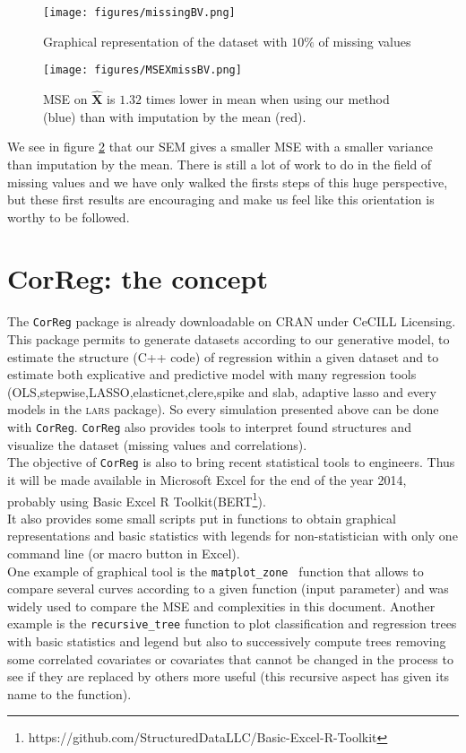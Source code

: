 \documentclass[12pt,a4paper]{report}
\begin{document}
	\begin{figure}[h!]
		\centering
		\texttt{[image: figures/missingBV.png]} 
		\caption{Graphical representation of the dataset with $10\%$ of missing values}\label{missingBV}
	\end{figure}
	\begin{figure}[h!]
		\centering
		\texttt{[image: figures/MSEXmissBV.png]} 
		\caption{MSE on $\hat{\boldsymbol{X}}$ is $1.32$ times lower in mean when using our method (blue) than with imputation by the mean (red).}\label{MSEXmissBV}
	\end{figure}
	We see in figure \ref{MSEXmissBV} that our SEM gives a smaller MSE with a smaller variance than imputation by the mean. There is still a lot of work to do in the field of missing values and we have only walked the firsts steps of this huge perspective, but these first results are encouraging and make us feel like this orientation is worthy to be followed.

\chapter{CorReg: the concept}	
	
		The {\tt CorReg} package is already downloadable on CRAN under CeCILL Licensing. This package permits to generate datasets according to our generative model, to estimate the structure (C++ code) of regression within a given dataset and to estimate both explicative and predictive model with many regression tools (OLS,stepwise,LASSO,elasticnet,clere,spike and slab, adaptive lasso and every models in the \textsc{lars} package). So every simulation presented above can be done with {\tt CorReg}.
	{\tt CorReg} also provides tools to interpret found structures and visualize the dataset (missing values and correlations). \\%
	The objective of {\tt CorReg} is also to bring recent statistical tools to engineers. Thus it will be made available in Microsoft Excel for the end of the year 2014, probably using Basic Excel R Toolkit(BERT\footnote{https://github.com/StructuredDataLLC/Basic-Excel-R-Toolkit}). \\
	
	It also provides some small scripts put in functions to obtain graphical representations and basic statistics with legends for non-statistician with only one command line (or macro button in Excel).\\
	 One example of graphical tool is the {\tt matplot\_zone } function that allows to compare several curves according to a given function (input parameter) and was widely used to compare the MSE and complexities in this document. Another example is the {\tt recursive\_tree} function to plot classification and regression trees with basic statistics and legend but also to successively compute trees removing some correlated covariates or covariates that cannot be changed in the process to see if they are replaced by others more useful (this recursive aspect has given its name to the function).\\
	 
\end{document}
